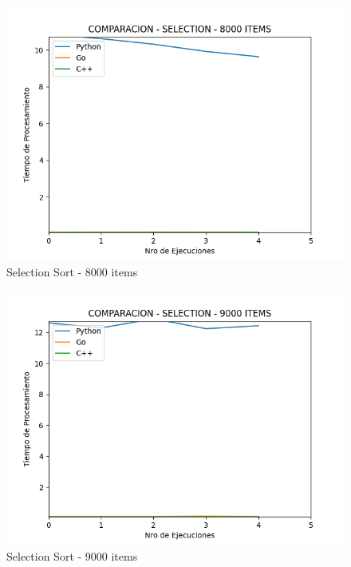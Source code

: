 \documentclass[12pt]{article} %
\begin{document}
    \vspace{5mm}
    
    \begin{figure}[H]
    \centering
    \includegraphics[width=\textwidth]{selection_8000}
    \caption{Selection Sort - 8000 items}
    \end{figure}

    \vspace{5mm}
    
    \begin{figure}[H]
    \centering
    \includegraphics[width=\textwidth]{selection_9000}
    \caption{Selection Sort - 9000 items}
    \end{figure}
\end{document}
